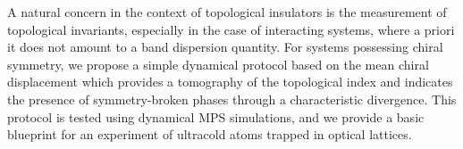 A natural concern in the context of topological insulators is the measurement of topological invariants, especially in the case of interacting systems, where a priori it does not amount to a band dispersion quantity.
For systems possessing chiral symmetry, we propose a simple dynamical protocol based on the mean chiral displacement which provides a tomography of the topological index and indicates the presence of symmetry-broken phases through a characteristic divergence.
This protocol is tested using dynamical MPS simulations, and we provide a basic blueprint for an experiment of ultracold atoms trapped in optical lattices.
